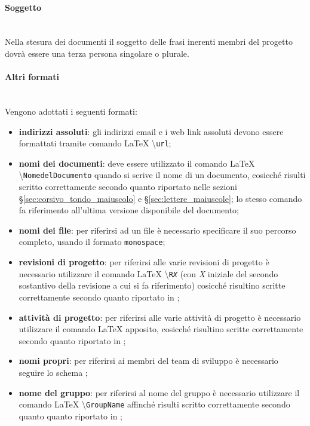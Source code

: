 \paragraph{Soggetto} \mbox{} \\
Nella stesura dei documenti il soggetto delle frasi inerenti membri del progetto dovrà essere una terza persona singolare o plurale.

\paragraph{Altri formati} \mbox{} \\
Vengono adottati i seguenti formati:
\begin{itemize}
	\item \textbf{indirizzi assoluti}: gli indirizzi email e i web link assoluti devono essere formattati tramite comando \LaTeX{} \textbackslash{\texttt{url}};
	\item \textbf{nomi dei documenti}: deve essere utilizzato il comando \LaTeX{} \textbackslash{\texttt{NomedelDocumento}} quando si scrive il nome di un documento, cosicché risulti scritto correttamente secondo quanto riportato nelle sezioni §\ref{sec:corsivo_tondo_maiuscolo} e §\ref{sec:lettere_maiuscole}; lo stesso comando fa riferimento all'ultima versione disponibile del documento;
	\item \textbf{nomi dei file}: per riferirsi ad un file è necessario specificare il suo percorso completo, usando il formato \texttt{monospace};
	\item \textbf{revisioni di progetto}: per riferirsi alle varie revisioni di progetto è necessario utilizzare il comando \LaTeX{} \textbackslash{\texttt{R\textit{X}}} (con \textit{X} iniziale del secondo sostantivo della revisione a cui si fa riferimento) cosicché risultino scritte correttamente secondo quanto riportato in ;
	\item \textbf{attività di progetto}: per riferirsi alle varie attività di progetto è necessario utilizzare il comando \LaTeX{} apposito, cosicché risultino scritte correttamente secondo quanto riportato in ;
	\item \textbf{nomi propri}: per riferirsi ai membri del team di sviluppo è necessario seguire lo schema ;
	\item \textbf{nome del gruppo}: per riferirsi al nome del gruppo è necessario utilizzare il comando \LaTeX{} \textbackslash{\texttt{GroupName}} affinché risulti scritto correttamente secondo quanto quanto riportato in ;

\end{itemize}
